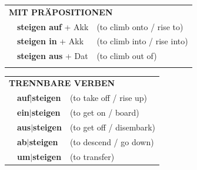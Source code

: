 \documentclass[10pt,a4paper]{revtex4-2}
\begin{document}
\begin{verbbox}
 \vspace{10pt}

\begin{tabular}{lll}
      \multicolumn{3}{l}{\textbf{MIT PRÄPOSITIONEN}}\\
& \textbf{steigen auf} + Akk & (to climb onto / rise to)\\
& \textbf{steigen in} + Akk & (to climb into / rise into)\\
& \textbf{steigen aus} + Dat & (to climb out of)\\
\vspace{20pt}
\end{tabular}
  \hfill
\begin{tabular}{lll}
      \multicolumn{3}{l}{\textbf{TRENNBARE VERBEN}}\\
 & \textbf{auf$|$steigen} & (to take off / rise up)\\
 & \textbf{ein$|$steigen} & (to get on / board)\\
 & \textbf{aus$|$steigen} & (to get off / disembark)\\
 & \textbf{ab$|$steigen} & (to descend / go down)\\
  & \textbf{um$|$steigen} & (to transfer)\\
  \end{tabular}


  \vspace{-5pt}
  \end{verbbox}
\end{document}
